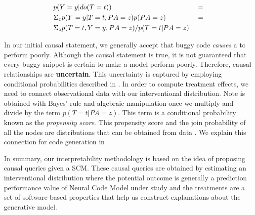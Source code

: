 \begin{subequations}
    {%
        \begin{align}
        &p(Y=y|do(T=t)) &&=  \label{eq:effect-1}\\
        &\Sigma_z p(Y=y|T=t,PA=z)p(PA=z)  &&= \label{eq:effect-2}\\
        &\Sigma_z p(T=t,Y=y,PA=z)/p(T=t|PA=z) \label{eq:effect-3}
        \end{align}
    }
\label{eq:effect}
\end{subequations}

In our initial causal statement, we generally accept that buggy code \textit{causes} a \nlm to perform poorly. Although the causal statement is true, it is not guaranteed that every buggy snippet is certain to make a model perform poorly. Therefore, causal relationships are \textbf{uncertain}. This uncertainty is captured by employing conditional probabilities described in . In order to compute treatment effects, we need to connect observational data with our interventional distribution. Note  is obtained with Bayes' rule and algebraic manipulation once we multiply and divide by the term $p(T=t|PA=z)$. This term is a conditional probability known as the \textit{propensity score}. This propensity score and the join probability of all the nodes are distributions that can be obtained from data \citep{Pearl2016Causality}. We explain this connection for code generation in . 

In summary, our interpretability methodology \codegen is based on the idea of proposing causal queries given a SCM. These causal queries are obtained by estimating an interventional distribution where the potential outcome is generally a prediction performance value of Neural Code Model under study and the treatments are a set of software-based properties that help us construct explanations about the generative model.